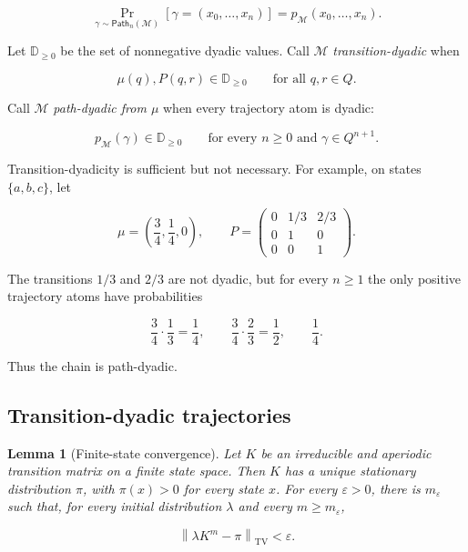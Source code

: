 \documentclass[10pt]{article}
\newtheorem{lemma}[theorem]{Lemma}
\theoremstyle{definition}
\newcommand{\Path}{\mathsf{Path}}
\newcommand{\TV}{\mathrm{TV}}
\begin{document}
\begin{equation}
 \Pr_{\gamma\sim\Path_n(\mathcal M)}
 \left[\gamma=(x_0,\ldots,x_n)\right]
 =p_{\mathcal M}(x_0,\ldots,x_n).
\end{equation}

Let $\mathbb D_{\ge0}$ be the set of nonnegative dyadic values.  Call
$\mathcal M$ \emph{transition-dyadic} when

\begin{equation}
 \mu(q),P(q,r)\in\mathbb D_{\ge0}
 \qquad\text{for all }q,r\in Q.
\end{equation}

Call $\mathcal M$ \emph{path-dyadic from $\mu$} when every trajectory atom is
dyadic:

\begin{equation}
 p_{\mathcal M}(\gamma)\in\mathbb D_{\ge0}
 \qquad\text{for every }n\ge0\text{ and }\gamma\in Q^{n+1}.
\end{equation}

Transition-dyadicity is sufficient but not necessary.  For example, on states
$\{a,b,c\}$, let

\begin{equation}
 \mu=\left(\frac34,\frac14,0\right),\qquad
 P=\begin{pmatrix}0&1/3&2/3\\0&1&0\\0&0&1\end{pmatrix}.
\end{equation}

The transitions $1/3$ and $2/3$ are not dyadic, but for every $n\ge1$ the only
positive trajectory atoms have probabilities

\begin{equation}
 \frac34\cdot\frac13=\frac14,\qquad
 \frac34\cdot\frac23=\frac12,\qquad
 \frac14.
\end{equation}

Thus the chain is path-dyadic.

\subsection{Transition-dyadic trajectories}

\begin{lemma}[Finite-state convergence]
\label{lem:finite-convergence}
Let $K$ be an irreducible and aperiodic transition matrix on a finite state
space.  Then $K$ has a unique stationary distribution $\pi$, with
$\pi(x)>0$ for every state $x$.  For every $\varepsilon>0$, there is
$m_\varepsilon$ such that, for every initial distribution $\lambda$ and every
$m\ge m_\varepsilon$,

\begin{equation}
 \left\|\lambda K^m-\pi\right\|_{\TV}<\varepsilon.
\end{equation}
\end{lemma}
\end{document}
